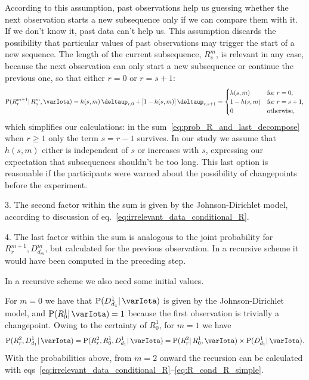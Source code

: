 \documentclass[\ifafour a4paper,12pt,\else a5paper,10pt,\fi%
onecolumn,oneside,article,%
british%
]{memoir}
\theoremstyle{remark}
\theoremstyle{innote}
\newcommand*{\delt}{\deltaup}%
\renewcommand{\ge}{\geqslant}%
\newcommand*{\p}{\mathrm{P}}%
\renewcommand*{\|}{\mathpunct{|}}
\newcommand*{\eqn}{eq.}%
\newcommand*{\eqns}{eqs}%
\newcommand*{\yI}{\varIota}
\newcommand*{\yrs}{h}
\begin{document}
According to this assumption, past observations help us guessing whether
the next observation starts a new subsequence only if we can compare them
with it. If we don't know it, past data can't help us. This assumption
discards the possibility that particular values of past observations may
trigger the start of a new sequence. The length of the current subsequence,
$R^{m}_{s}$, is relevant in any case, because the next observation can only
start a new subsequence or continue the previous one, so that either $r=0$
or $r=s+1$:
\begin{equation}
  \label{eq:R_cond_R_simple}
  \p(R^{m+1}_{r} \| R^{m}_{s}, \yI) =
  \yrs(s,m)\,\delt_{r,0} + [1-\yrs(s,m)]\,\delt_{r,s+1} =
  \begin{cases}
    \yrs(s,m) & \text{for $r=0$},
    \\
    1-\yrs(s,m) &\text{for $r=s+1$},
    \\
    0 & \text{otherwise},
  \end{cases}
\end{equation}
which simplifies our calculations: in the
sum~\eqref{eq:prob_R_and_last_decompose} when $r\ge 1$ only the term
$s=r-1$ survives. In our study we assume that $\yrs(s,m)$ either is
independent of $s$ or increases with $s$, expressing our expectation that
subsequences shouldn't be too long. This last option is reasonable if the
participants were warned about the possibility of changepoints before the
experiment.

3. The second factor within the sum is given by the Johnson-Dirichlet
model, according to discussion of
\eqn~\eqref{eq:irrelevant_data_conditional_R}.

4. The last factor within the sum is analogous to the joint probability for
$R^{m+1}_{r}, D^{m}_{d_{m}}$, but calculated for the previous observation.
In a recursive scheme it would have been computed in the preceding step.


\bigskip

In a recursive scheme we also need some initial values.

For $m=0$ we have that $\p(D^{1}_{d_1} \| \yI)$ is given by the
Johnson-Dirichlet model, and $\p(R^{1}_{0} \| \yI)=1$ because the first
observation is trivially a changepoint. Owing to the certainty of $R^1_0$,
for $m=1$ we have
\begin{equation}
  \label{eq:initial_R2}
  \p(R^{2}_{r}, D^{1}_{d_{1}} \|  \yI)
  = \p(R^{2}_{r},R^{1}_{0}, D^{1}_{d_{1}} \|  \yI)
  = \p(R^{2}_{r} \| R^{1}_{0},  \yI) \times
  \p( D^{1}_{d_{1}} \|  \yI).
\end{equation}
With the probabilities above, from $m=2$ onward the recursion can be
calculated with
\eqns~\eqref{eq:irrelevant_data_conditional_R}--\eqref{eq:R_cond_R_simple}.
\end{document}
